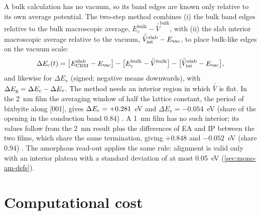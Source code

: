 A bulk calculation has no vacuum, so its band edges are known only relative to its own average potential. The two-step
method \citep{VandeWalle1987,Baldereschi1988} combines (i) the bulk band edges relative to the bulk macroscopic average,
$E_{c}^{\mathrm{bulk}} - \bar{\bar V}^{\mathrm{bulk}}$, with (ii) the slab interior macroscopic average relative to the
vacuum, $\bar{\bar V}^{\mathrm{slab}}_{\mathrm{int}} - E_{\mathrm{vac}}$, to place bulk-like edges on the vacuum scale:
\begin{equation}
\Delta E_{\mathrm{c}}(t) = \big[E_{\mathrm{CBM}}^{\mathrm{slab}} - E_{\mathrm{vac}}\big] - \big[E_{c}^{\mathrm{bulk}} - \bar{\bar V}^{\mathrm{bulk}}\big]
 - \big[\bar{\bar V}^{\mathrm{slab}}_{\mathrm{int}} - E_{\mathrm{vac}}\big],
\label{eq:mono-dft-twostep}
\end{equation}
and likewise for $\Delta E_{\mathrm{v}}$ (signed; negative means downwards), with $\Delta E_{\mathrm{g}} = \Delta E_{\mathrm{c}} - \Delta E_{\mathrm{v}}$.
The method needs an interior region in which $\bar{\bar V}$ is flat. In the 2~nm film the averaging window of half the
lattice constant, the period of bixbyite along [001], gives $\Delta E_{\mathrm{c}} = +0.281$~eV and $\Delta E_{\mathrm{v}} = -0.054$~eV
(share of the opening in the conduction band 0.84) . A 1~nm film has no such interior; its values follow from
the 2~nm result plus the differences of EA and IP between the two films, which share the same termination, giving
$+0.848$ and $-0.052$~eV (share 0.94) . The amorphous read-out applies the same rule: alignment is valid only
with an interior plateau with a standard deviation of at most 0.05~eV (\cref{sec:mono-am-defs}).

\section{Computational cost}
\label{sec:mono-dft-cost}

